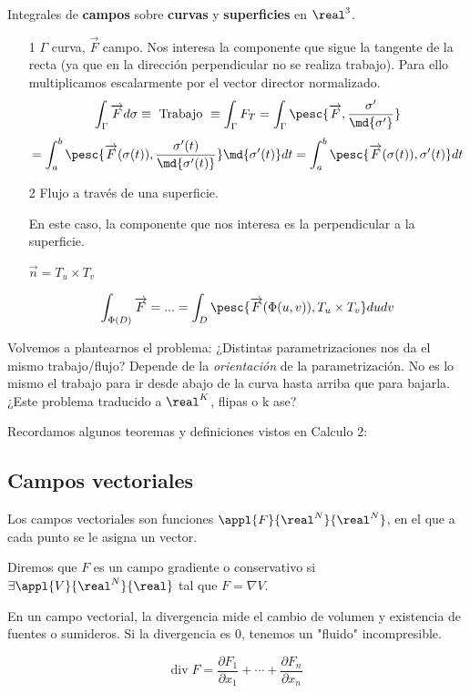 Integrales de \textbf{campos} sobre \textbf{curvas} y \textbf{superficies} en $\real^3$.

\begin{itemize}
\item[1] $\Gamma$ curva, $\overrightarrow{F}$ campo. Nos interesa la componente que sigue la tangente de la recta (ya que en la dirección perpendicular no se realiza trabajo). Para ello multiplicamos escalarmente por el vector director normalizado.
\[\int_{\Gamma} \overrightarrow{F}d\sigma \equiv \text{ Trabajo } \equiv \int_{\Gamma} F_T = \int_{\Gamma} \pesc{\overrightarrow{F},\frac{\sigma'}{\md{\sigma'}}}\]
\[ = \int_a^b \pesc{\overrightarrow{F}(\sigma(t)),\frac{\sigma'(t)}{\md{\sigma'(t)}}} \md{\sigma'(t)}dt = \int_a^b \pesc{\overrightarrow{F}(\sigma(t)),\sigma'(t)} dt\]

\item[2] Flujo a través de una superficie.

En este caso, la componente que nos interesa es la perpendicular a la superficie.

$\overrightarrow{n} = T_u\times T_v$

\[\int_{\Phi(D)} \overrightarrow{F} = ... = \int_{D} \pesc{\overrightarrow{F}(\Phi(u,v)),T_u\times T_v}dudv\]
\end{itemize}

Volvemos a plantearnos el problema: ¿Distintas parametrizaciones nos da el mismo trabajo/flujo? Depende de la \textit{orientación} de la parametrización. No es lo mismo el trabajo para ir desde abajo de la curva hasta arriba que para bajarla. ¿Este problema traducido a $\real^K$, flipas o k ase?


Recordamos algunos teoremas y definiciones vistos en Calculo 2:

\subsection{Campos vectoriales}
Los campos vectoriales son funciones $\appl{F}{\real^N}{\real^N}$, en el que a cada punto se le asigna un vector.

\begin{defn}
Diremos que $F$ es un campo gradiente o conservativo si $\exists \appl{V}{\real^N}{\real}$ tal que $F=\nabla V$.
\end{defn}

\begin{defn}[Divergencia]
En un campo vectorial, la divergencia mide el cambio de volumen y existencia de fuentes o sumideros. Si la divergencia es 0, tenemos un "fluido" incompresible.

\[ \textrm{div}\;F = \frac{∂F_1}{∂x_1} + \cdots + \frac{∂F_n}{∂x_n} \]
\end{defn}

